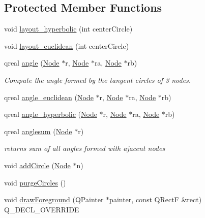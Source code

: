 \subsection*{Protected Member Functions}
\begin{DoxyCompactItemize}
\item 
void \hyperlink{class_packing_a2cf517a5c828f7fb0399e25eb196f193}{layout\+\_\+hyperbolic} (int center\+Circle)
\item 
void \hyperlink{class_packing_a083f64ff591c652b1dfd9b0543fb95b4}{layout\+\_\+euclidean} (int center\+Circle)
\item 
qreal \hyperlink{class_packing_a81020dc1688f59fcf2a0b67ff04a0c41}{angle} (\hyperlink{class_node}{Node} $\ast$r, \hyperlink{class_node}{Node} $\ast$ra, \hyperlink{class_node}{Node} $\ast$rb)
\begin{DoxyCompactList}\small\item\em Compute the angle formed by the tangent circles of 3 nodes. \end{DoxyCompactList}\item 
qreal \hyperlink{class_packing_a65436a9a927a45fe1e2cb517a06d2725}{angle\+\_\+euclidean} (\hyperlink{class_node}{Node} $\ast$r, \hyperlink{class_node}{Node} $\ast$ra, \hyperlink{class_node}{Node} $\ast$rb)
\item 
qreal \hyperlink{class_packing_a1d34d6a5cfd944dbd3a8f3ca931c5017}{angle\+\_\+hyperbolic} (\hyperlink{class_node}{Node} $\ast$r, \hyperlink{class_node}{Node} $\ast$ra, \hyperlink{class_node}{Node} $\ast$rb)
\item 
qreal \hyperlink{class_packing_a8042d10207d65261a1c66e50467082cc}{anglesum} (\hyperlink{class_node}{Node} $\ast$r)
\begin{DoxyCompactList}\small\item\em returns sum of all angles formed with ajacent nodes \end{DoxyCompactList}\item 
void \hyperlink{class_packing_a25fb2ac12aa7ef3965304ed9e047dc37}{add\+Circle} (\hyperlink{class_node}{Node} $\ast$n)
\item 
void \hyperlink{class_packing_a89dcb1adeeeef440403a8f3738175980}{purge\+Circles} ()
\item 
void \hyperlink{class_packing_a108400e1db70bf6083d5ba4d543eec85}{draw\+Foreground} (Q\+Painter $\ast$painter, const Q\+Rect\+F \&rect) Q\+\_\+\+D\+E\+C\+L\+\_\+\+O\+V\+E\+R\+R\+I\+D\+E
\end{DoxyCompactItemize}
